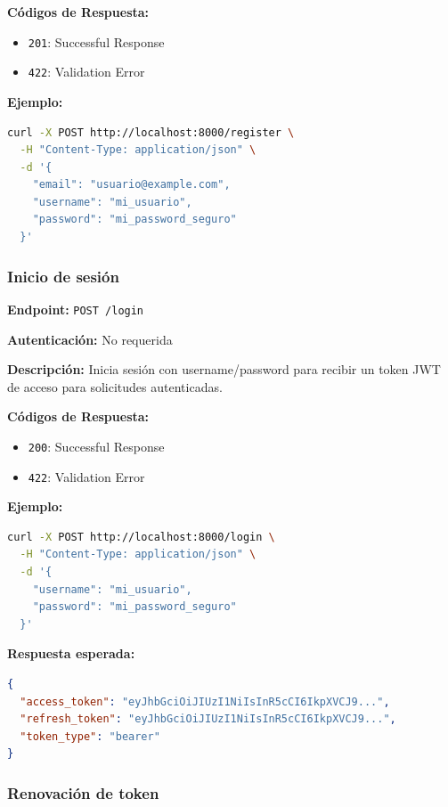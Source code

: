 \textbf{Códigos de Respuesta:}
\begin{itemize}
    \item \texttt{201}: Successful Response
    \item \texttt{422}: Validation Error
\end{itemize}

\textbf{Ejemplo:}

\begin{lstlisting}[language=bash]
curl -X POST http://localhost:8000/register \
  -H "Content-Type: application/json" \
  -d '{
    "email": "usuario@example.com",
    "username": "mi_usuario",
    "password": "mi_password_seguro"
  }'
\end{lstlisting}

\subsubsection{Inicio de sesión}
\label{subsubsection:Inicio de sesión}

\textbf{Endpoint:} \texttt{POST /login}

\textbf{Autenticación:} No requerida

\textbf{Descripción:} Inicia sesión con username/password para recibir un token JWT de acceso para solicitudes autenticadas.

\textbf{Códigos de Respuesta:}
\begin{itemize}
    \item \texttt{200}: Successful Response
    \item \texttt{422}: Validation Error
\end{itemize}

\textbf{Ejemplo:}

\begin{lstlisting}[language=bash]
curl -X POST http://localhost:8000/login \
  -H "Content-Type: application/json" \
  -d '{
    "username": "mi_usuario",
    "password": "mi_password_seguro"
  }'
\end{lstlisting}

\textbf{Respuesta esperada:}

\begin{lstlisting}[language=json]
{
  "access_token": "eyJhbGciOiJIUzI1NiIsInR5cCI6IkpXVCJ9...",
  "refresh_token": "eyJhbGciOiJIUzI1NiIsInR5cCI6IkpXVCJ9...",
  "token_type": "bearer"
}
\end{lstlisting}

\subsubsection{Renovación de token}
\label{subsubsection:Renovación de token}

